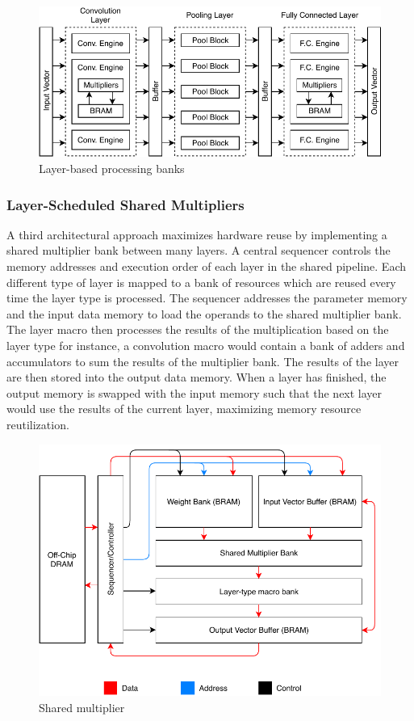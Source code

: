 \documentclass{uw-ece-wkrpt}
\begin{document}
\begin{figure}
    \centering
    \includegraphics{figures/layer-based_processing}
    \caption{Layer-based processing banks}\label{fig:layer-based_processing}
\end{figure}

\subsubsection{Layer-Scheduled Shared Multipliers}

A third architectural approach maximizes hardware reuse by implementing a shared multiplier bank between many layers. A central sequencer controls the memory addresses and execution order of each layer in the shared pipeline. Each different type of layer is mapped to a bank of resources which are reused every time the layer type is processed. The sequencer addresses the parameter memory and the input data memory to load the operands to the shared multiplier bank. The layer macro then processes the results of the multiplication based on the layer type \textemdash{} for instance, a convolution macro would contain a bank of adders and accumulators to sum the results of the multiplier bank. The results of the layer are then stored into the output data memory. When a layer has finished, the output memory is swapped with the input memory such that the next layer would use the results of the current layer, maximizing memory resource reutilization.

\begin{figure}
    \centering
    \includegraphics{figures/shared_multiplier}
    \caption{Shared multiplier \cite{Ma2017An-automatic-RT}}\label{fig:shared_multiplier}
\end{figure}
\end{document}
